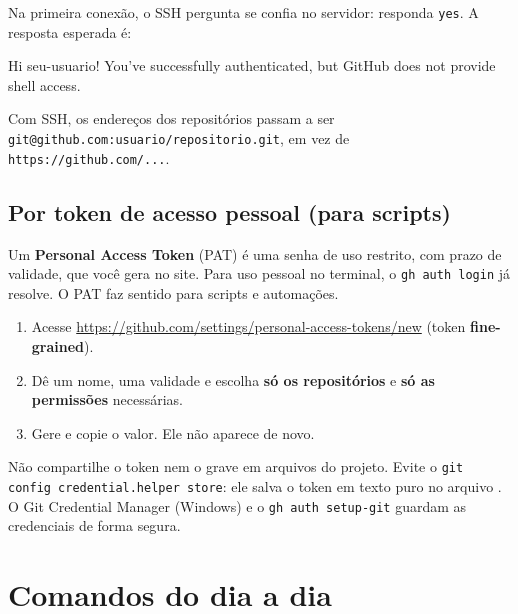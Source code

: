 Na primeira conexão, o SSH pergunta se confia no servidor: responda
\texttt{yes}. A resposta esperada é:

\begin{saida}
Hi seu-usuario! You've successfully authenticated, but GitHub does not provide shell access.
\end{saida}

Com SSH, os endereços dos repositórios passam a ser
\texttt{git@github.com:usuario/repositorio.git}, em vez de
\texttt{https://github.com/...}.

\subsection{Por token de acesso pessoal (para scripts)}

Um \textbf{Personal Access Token} (PAT) é uma senha de uso restrito, com prazo
de validade, que você gera no site. Para uso pessoal no terminal, o
\texttt{gh auth login} já resolve. O PAT faz sentido para scripts e
automações.

\begin{enumerate}
  \item Acesse \url{https://github.com/settings/personal-access-tokens/new}
        (token \textbf{fine-grained}).
  \item Dê um nome, uma validade e escolha \textbf{só os repositórios} e
        \textbf{só as permissões} necessárias.
  \item Gere e copie o valor. Ele não aparece de novo.
\end{enumerate}

\begin{aviso}
Não compartilhe o token nem o grave em arquivos do projeto. Evite o
\texttt{git config credential.helper store}: ele salva o token em texto puro
no arquivo . O Git Credential Manager
(Windows) e o \texttt{gh auth setup-git} guardam as credenciais de forma
segura.
\end{aviso}

\section{Comandos do dia a dia}

